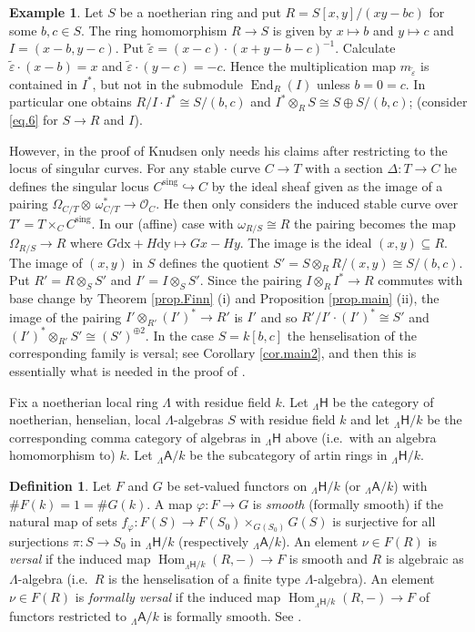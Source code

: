 \documentclass[a4paper,10pt]{amsart}
\theoremstyle{plain}
\theoremstyle{definition}
\newtheorem{defn}[xx]{Definition}%
\newtheorem{ex}[xx]{Example}%
\theoremstyle{remark}
\numberwithin{equation}{xx}
\DeclareMathOperator{\End}{End}
\DeclareMathOperator{\Hom}{Hom}
\newcommand{\ra}{\rightarrow}
\newcommand{\hra}{\hookrightarrow}
\newcommand{\ot}{{\otimes}}
\newcommand{\vare}{\varepsilon}
\newcommand{\vL}{\varLambda}
\newcommand{\sbeq}{\subseteq}
\renewcommand{\phi}{\varphi}
\newcommand{\cat}[1]{\mathsf{{#1}}}
\newcommand{\hm}[4]{{\Hom}_{#2}^{#1}({#3},{#4})}
\newcommand{\mr}[1]{\mathrm{{#1}}}
\newcommand{\nd}[3]{{\End} _{#2}^{#1}({#3})}
\newcommand{\Q}{\mathcal{O}}
\begin{document}
\begin{ex}\label{ex.Finn2}
Let \(S\) be a noetherian ring and put \(R=S[x,y]/(xy-bc)\) for some \(b,c\in S\). The ring homomorphism \(R\ra S\) is given by \(x\mapsto b\) and \(y\mapsto c\) and \(I=(x-b,y-c)\). Put \(\tilde{\vare}=(x-c)\cdot(x+y-b-c)^{-1}\). Calculate \(\tilde{\vare}\cdot(x-b)=x\) and \(\tilde{\vare}\cdot(y-c)=-c\). Hence the multiplication map \(m_{\tilde{\vare}}\) is contained in \(I^{*}\), but not in the submodule \(\nd{}{R}{I}\) unless \(b=0=c\). In particular one obtains \(R/I{\cdot}I^{*}\cong S/(b,c)\) and \(I^{*}\ot_{R}S\cong S{\oplus}S/(b,c)\); (consider \eqref{eq.6} for \(S\ra R\) and \(I\)).

However, in the proof of \cite[3.7]{knu:83a} Knudsen only needs his claims after restricting to the locus of singular curves. For any stable curve \(C\ra T\) with a section \(\Delta:T\ra C\) he defines the singular locus \(C^{\text{sing}}\hra C\) by the ideal sheaf given as the image of a pairing \(\Omega_{C/T}\ot\,\omega_{C/T}^{*}\ra \Q_{C}\). He then only considers the induced stable curve over \(T'=T{\times}_{C}C^{\text{sing}}\). In our (affine) case with \(\omega_{R/S}\cong R\) the pairing becomes the map \(\Omega_{R/S}\ra R\) where \(G\mr{dx}+H\mr{dy}\mapsto Gx-Hy\). The image is the ideal \((x,y)\sbeq R\). The image of \((x,y)\) in \(S\) defines the quotient \(S'=S\ot_{R}R/(x,y)\cong S/(b,c)\). Put \(R'=R\ot_{S}S'\) and \(I'=I\ot_{S}S'\). 
Since the pairing \(I\ot_{R}I^{*}\ra R\) commutes with base change by Theorem \ref{prop.Finn} (i) and Proposition \ref{prop.main} (ii), the image of the pairing \(I'\ot_{R'}(I')^{*}\ra R'\) is \(I'\) and so \(R'/I'{\cdot}(I')^{*}\cong S'\) and \((I')^{*}\ot_{R'}S'\cong (S')^{\oplus 2}\). In the case \(S=k[b,c]\) the henselisation of the corresponding family is versal; see Corollary \ref{cor.main2}, and then this is essentially what is needed in the proof of \cite[3.7]{knu:83a}.
\end{ex}
Fix a noetherian local ring \(\vL\) with residue field \(k\). Let \({}_{\vL}\cat{H}\) be the category of noetherian, henselian, local \(\vL\)-algebras \(S\) with residue field \(k\) and let \({}_{\vL}\cat{H}/k\) be the corresponding comma category of algebras in \({}_{\vL}\cat{H}\) above (i.e.\ with an algebra homomorphism to) \(k\). Let \({}_{\vL}\cat{A}/k\) be the subcategory of artin rings in \({}_{\vL}\cat{H}/k\).
\begin{defn}\label{def.versal}
Let \(F\) and \(G\) be set-valued functors on \({}_{\vL}\cat{H}/k\) (or \({}_{\vL}\cat{A}/k\)) with \(\#F(k)=1=\#G(k)\). A map \(\phi:F\ra G\)
is \emph{smooth} (formally smooth) if the natural map of sets \(f_{\phi}:F(S)\ra F(S_{0})\times_{G(S_{0})}G(S)\) is surjective for all surjections \(\pi:S\ra S_{0}\) in \({}_{\vL}\cat{H}/k\) (respectively \({}_{\vL}\cat{A}/k\)). An element \(\nu\in F(R)\) is \emph{versal} if the induced map \(\hm{}{{}_{\vL}\cat{H}/k}{R}{-}\ra F\) is smooth and \(R\) is algebraic as \(\vL\)-algebra (i.e.\ \(R\) is the henselisation of a finite type \(\vL\)-algebra). An element \(\nu\in F(R)\) is \emph{formally versal} if the induced map \(\hm{}{{}_{\vL}\cat{H}/k}{R}{-}\ra F\) of functors restricted to \({}_{\vL}\cat{A}/k\) is formally smooth.
See \cite{art:74}. 
\end{defn}
\end{document}
